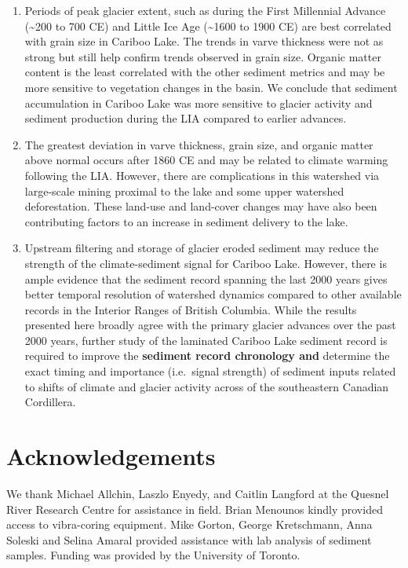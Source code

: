 \documentclass[Royal,times,doublespace,sageh]{sagej}
\begin{document}
\begin{enumerate}
\item
  Periods of peak glacier extent, such as during the First Millennial
  Advance (\textasciitilde200 to 700 CE) and Little Ice Age
  (\textasciitilde1600 to 1900 CE) are best correlated with grain size
  in Cariboo Lake. The trends in varve thickness were not as strong but
  still help confirm trends observed in grain size. Organic matter
  content is the least correlated with the other sediment metrics and
  may be more sensitive to vegetation changes in the basin. We conclude
  that sediment accumulation in Cariboo Lake was more sensitive to
  glacier activity and sediment production during the LIA compared to
  earlier advances.
\item
  The greatest deviation in varve thickness, grain size, and organic
  matter above normal occurs after 1860 CE and may be related to climate
  warming following the LIA. However, there are complications in this
  watershed via large-scale mining proximal to the lake and some upper
  watershed deforestation. These land-use and land-cover changes may
  have also been contributing factors to an increase in sediment
  delivery to the lake.
\item
  Upstream filtering and storage of glacier eroded sediment may reduce
  the strength of the climate-sediment signal for Cariboo Lake. However,
  there is ample evidence that the sediment record spanning the last
  2000 years gives better temporal resolution of watershed dynamics
  compared to other available records in the Interior Ranges of British
  Columbia. While the results presented here broadly agree with the
  primary glacier advances over the past 2000 years, further study of
  the laminated Cariboo Lake sediment record is required to improve the
  \textbf{sediment record chronology and} determine the exact timing and
  importance (i.e.~signal strength) of sediment inputs related to shifts
  of climate and glacier activity across of the southeastern Canadian
  Cordillera.
\end{enumerate}

\pagebreak

\hypertarget{acknowledgements}{%
\section{Acknowledgements}\label{acknowledgements}}

We thank Michael Allchin, Laszlo Enyedy, and Caitlin Langford at the
Quesnel River Research Centre for assistance in field. Brian Menounos
kindly provided access to vibra-coring equipment. Mike Gorton, George
Kretschmann, Anna Soleski and Selina Amaral provided assistance with lab
analysis of sediment samples. Funding was provided by the University of
Toronto.
\end{document}
